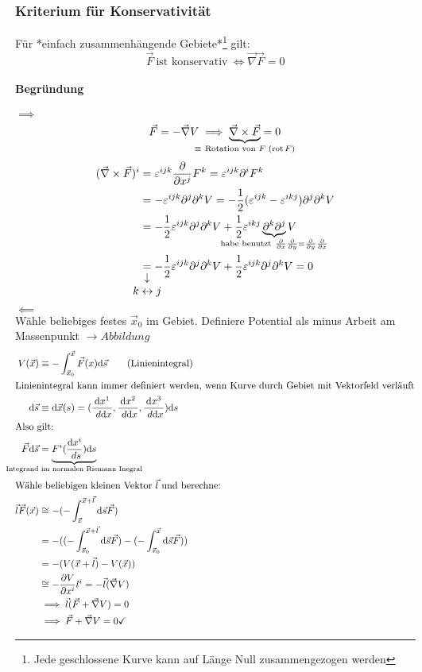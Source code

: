 \documentclass[a4paper]{scrartcl}
\DeclareMathOperator{\rot}{rot}
\renewcommand{\d}{\mathrm{d}}
\newcommand{\dd}[2]{\frac{\d #1}{\ d#2}}
\renewcommand{\v}[1]{\vec{#1}}
\theoremstyle{definition}
\theoremstyle{plain}
\theoremstyle{remark}
\theoremstyle{remark}
\begin{document}
\subsubsection{Kriterium für Konservativität}
\label{sec-4-3-2}
Für *einfach zusammenhängende Gebiete*\footnote{Jede geschlossene Kurve kann auf Länge Null zusammengezogen werden} gilt:
\[\v F ~\text{ist konservativ}~ \iff \v\nabla\v F = 0\]
\paragraph{Begründung}
\label{sec-4-3-2-1}
$\implies$ \\ \[\v F = -\v\nabla V \implies \underbrace{\v\nabla\times\v F}_{\mathclap{\equiv~\text{Rotation von $F$ ($\rot{F}$)}}} = 0\]
\begin{align*}
(\v\nabla\times\v F)^i &= \varepsilon^{ijk} \frac{\partial}{\partial x^j} F^k = \varepsilon^{ijk}\partial^i F^k \\
&= -\varepsilon^{ijk}\partial^j\partial^k V = -\frac{1}{2}(\varepsilon^{ijk} -\varepsilon^{ikj})\partial^j\partial^k V \\
&= - \frac{1}{2}\varepsilon^{ijk}\partial^j \partial^k V + \frac{1}{2}\varepsilon^{ikj}\underbrace{\partial^k\partial^j}_{\mathclap{\text{habe benutzt}~\frac{\partial}{\partial x}\frac{\partial}{\partial y} = \frac{\partial}{\partial y}\frac{\partial}{\partial x}}} V \\
&\underarrow[=]{$k \leftrightarrow j$} -\frac{1}{2}\varepsilon^{ijk}\partial^j\partial^k V + \frac{1}{2}\varepsilon^{ijk}\partial^j\partial^k V = 0
\end{align*}
$\impliedby$ \\
     Wähle beliebiges festes $\v x_0$ im Gebiet. Definiere Potential als minus Arbeit am Massenpunkt $\rightarrow Abbildung$
\begin{align*}
V(\v x) &\equiv -\int_{\v x_0}^{\v x} \v F(x)\d\v s \tag{Linienintegral} \\
\intertext{Linienintegral kann immer definiert werden, wenn Kurve durch Gebiet mit Vektorfeld verläuft}
\d\v s &\equiv \d\v x(s) =(\dd{x^1}{\d x}, \dd{x^2}{\d x}, \dd{x^3}{\d x}) \d s \\
\intertext{Also gilt:}
\v F\d\v s &= \underbrace{F^i (\dd{x^i}{s})\d s}_{\mathclap{\text{Integrand im normalen Riemann Inegral}}} \\
\intertext{Wähle beliebigen kleinen Vektor $\v l$ und berechne:}
\v l \v F(\v x) &\cong -(-\int_{\v x}^{\v x + \v l} \d\v s \v F) \\
&= -((-\int_{\v x_0}^{\v x + \v l} \d \v s \v F) - ( -\int_{\v x_0}^{\v x} \d\v s \v F)) \\
&= -(V(\v x + \v l) -V(\v x)) \\
&\cong - \frac{\partial V}{\partial x^i}l^i = -\v l(\v\nabla V) \\
&\implies \v l(\v F + \v\nabla V) = 0 \\
&\implies \v F + \v\nabla V = 0 \checkmark
\end{align*}
\end{document}
